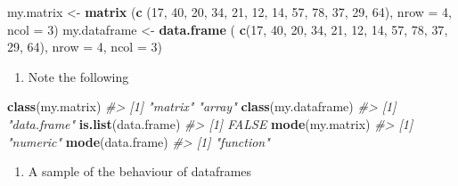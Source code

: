 \documentclass[
]{book}
\newenvironment{Shaded}{\begin{snugshade}}{\end{snugshade}}
\newcommand{\AttributeTok}[1]{\textcolor[rgb]{0.13,0.29,0.53}{#1}}
\newcommand{\CommentTok}[1]{\textcolor[rgb]{0.56,0.35,0.01}{\textit{#1}}}
\newcommand{\DecValTok}[1]{\textcolor[rgb]{0.00,0.00,0.81}{#1}}
\newcommand{\FunctionTok}[1]{\textcolor[rgb]{0.13,0.29,0.53}{\textbf{#1}}}
\newcommand{\NormalTok}[1]{#1}
\newcommand{\OtherTok}[1]{\textcolor[rgb]{0.56,0.35,0.01}{#1}}
\providecommand{\tightlist}{%
  \setlength{\itemsep}{0pt}\setlength{\parskip}{0pt}}
\begin{document}
\begin{Shaded}
\begin{Highlighting}[]
\NormalTok{my.matrix }\OtherTok{\textless{}{-}} \FunctionTok{matrix}\NormalTok{ (}\FunctionTok{c}\NormalTok{ (}\DecValTok{17}\NormalTok{, }\DecValTok{40}\NormalTok{, }\DecValTok{20}\NormalTok{, }\DecValTok{34}\NormalTok{, }\DecValTok{21}\NormalTok{, }\DecValTok{12}\NormalTok{, }\DecValTok{14}\NormalTok{, }\DecValTok{57}\NormalTok{,}
                        \DecValTok{78}\NormalTok{, }\DecValTok{37}\NormalTok{, }\DecValTok{29}\NormalTok{, }\DecValTok{64}\NormalTok{), }\AttributeTok{nrow =} \DecValTok{4}\NormalTok{, }\AttributeTok{ncol =} \DecValTok{3}\NormalTok{)}
\NormalTok{my.dataframe }\OtherTok{\textless{}{-}} \FunctionTok{data.frame}\NormalTok{ ( }\FunctionTok{c}\NormalTok{(}\DecValTok{17}\NormalTok{, }\DecValTok{40}\NormalTok{, }\DecValTok{20}\NormalTok{, }\DecValTok{34}\NormalTok{, }\DecValTok{21}\NormalTok{, }\DecValTok{12}\NormalTok{, }\DecValTok{14}\NormalTok{, }\DecValTok{57}\NormalTok{,}
                               \DecValTok{78}\NormalTok{, }\DecValTok{37}\NormalTok{, }\DecValTok{29}\NormalTok{, }\DecValTok{64}\NormalTok{), }\AttributeTok{nrow =} \DecValTok{4}\NormalTok{, }\AttributeTok{ncol =} \DecValTok{3}\NormalTok{)}
\end{Highlighting}
\end{Shaded}

\begin{enumerate}
\def\labelenumi{(\alph{enumi})}
\setcounter{enumi}{2}
\tightlist
\item
  Note the following
\end{enumerate}

\begin{Shaded}
\begin{Highlighting}[]
\FunctionTok{class}\NormalTok{(my.matrix)}
\CommentTok{\#\textgreater{} [1] "matrix" "array"}
\FunctionTok{class}\NormalTok{(my.dataframe)}
\CommentTok{\#\textgreater{} [1] "data.frame"}
\FunctionTok{is.list}\NormalTok{(data.frame)}
\CommentTok{\#\textgreater{} [1] FALSE}
\FunctionTok{mode}\NormalTok{(my.matrix)}
\CommentTok{\#\textgreater{} [1] "numeric"}
\FunctionTok{mode}\NormalTok{(data.frame)}
\CommentTok{\#\textgreater{} [1] "function"}
\end{Highlighting}
\end{Shaded}

\begin{enumerate}
\def\labelenumi{(\alph{enumi})}
\setcounter{enumi}{3}
\tightlist
\item
  A sample of the behaviour of dataframes
\end{enumerate}
\end{document}
